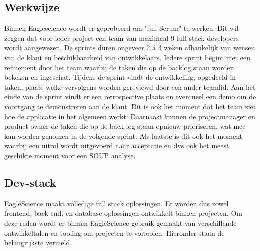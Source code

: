 \subsection{Werkwijze}\label{subsec:ESwerkwijze}
Binnen Eaglescience wordt er geprobeerd om "full Scrum" te werken. Dit wil zeggen dat voor ieder project een team van maximaal 9 full-stack developers wordt aangewezen. De sprints duren ongeveer 2 á 3 weken afhankelijk van wensen van de klant en beschikbaarheid van ontwikkelaars. Iedere sprint begint met een refinement door het team waarbij de taken die op de backlog staan worden bekeken en ingeschat. Tijdens de sprint vindt de ontwikkeling, opgedeeld in taken, plaats welke vervolgens worden gereviewd door een ander teamlid. Aan het einde van de sprint vindt er een retrospective plaats en eventueel een demo om de voortgang te demonstreren aan de klant. Dit is ook het moment dat het team ziet hoe de applicatie in het algemeen werkt. Daarnaast kunnen de projectmanager en product owner de taken die op de back-log staan opnieuw prioriseren, wat mee kan worden genomen in de volgende sprint. Als laatste is dit ook het moment waarbij een uitrol wordt uitgevoerd naar acceptatie en dys ook het meest geschikte moment voor een SOUP analyse.

\subsection{Dev-stack}\label{subsec:ESdev-stack}
EagleScience maakt volledige full stack oplossingen. Er worden dus zowel frontend, back-end, en database oplossingen ontwikkelt binnen projecten. Om deze reden wordt er binnen EagleScience gebruik gemaakt van verschillende ontwikkeltalen en tooling om projecten te voltooien. Hieronder staan de belangrijkste vermeld.


